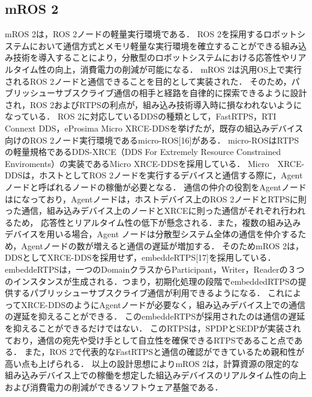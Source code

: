 \subsection{mROS 2}
mROS 2は，ROS 2ノードの軽量実行環境である．
ROS 2を採用するロボットシステムにおいて通信方式とメモリ軽量な実行環境を確立することができる組み込み技術を導入することにより，分散型のロボットシステムにおける応答性やリアルタイム性の向上，消費電力の削減が可能になる．
mROS 2は汎用OS上で実行されるROS 2ノードと通信できることを目的として実装された．
そのため，パブリッシューサブスクライブ通信の相手と経路を自律的に探索できるように設計され，ROS 2およびRTPSの利点が，組み込み技術導入時に損なわれないようになっている．
ROS 2に対応しているDDSの種類として，FastRTPS，RTI Connext DDS，eProsima Micro XRCE-DDSを挙げたが，既存の組込みデバイス向けのROS 2ノード実行環境であるmicro-ROS[16]がある．
micro-ROSはRTPSの軽量規格であるDDS-XRCE（DDS For Extremely Resource Constrained Enviroments）の実装であるMicro XRCE-DDSを採用している．
Micro　XRCE-DDSは，ホストとしてROS 2ノードを実行するデバイスと通信する際に，Agentノードと呼ばれるノードの稼働が必要となる．
通信の仲介の役割をAgentノードはになっており，Agentノードは，ホストデバイス上のROS 2ノードとRTPSに則った通信，組み込みデバイス上のノードとXRCEに則った通信がそれぞれ行われるため，
応答性とリアルタイム性の低下が懸念される．また，複数の組み込みデバイスを用いる場合，Agent ノードは分散型システム全体の通信を仲介するため，Agentノードの数が増えると通信の遅延が増加する．
そのためmROS 2は，DDSとしてXRCE-DDSを採用せず，embeddeRTPS[17]を採用している．
embeddeRTPSは，一つのDomainクラスからParticipant，Writer，Readerの３つのインスタンスが生成される．つまり，初期化処理の段階でembeddedRTPSの提供するパブリッシューサブスクライブ通信が利用できるようになる．
これによってXRCE-DDSのようにAgentノードが必要なく，組み込みデバイス上での通信の遅延を抑えることができる．
このembeddeRTPSが採用されたのは通信の遅延を抑えることができるだけではない．
このRTPSは，SPDPとSEDPが実装されており，通信の宛先や受け手として自立性を確保できるRTPSであること点である．
また，ROS 2で代表的なFastRTPSと通信の確認ができているため親和性が高い点も上げられる．
以上の設計思想によりmROS 2は，計算資源の限定的な組み込みデバイス上での稼働を想定した組込みデバイスのリアルタイム性の向上および消費電力の削減ができるソフトウェア基盤である．
